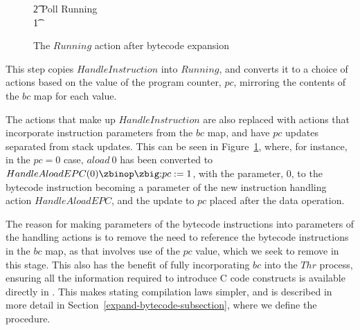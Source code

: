 \begin{figure}[tp]
\begin{circus}
    \t2 \circfi \circseq Poll \circseq Running \\
    \t1 \circfi
  \end{circus}
  \caption{The $Running$ action after bytecode expansion}
  \label{bytecode-expansion-example-figure}
\end{figure}
This step copies $HandleInstruction$ into $Running$, and converts it
to a choice of actions based on the value of the program counter,
$pc$, mirroring the contents of the $bc$ map for each value.

The actions that make up $HandleInstruction$ are also replaced with
actions that incorporate instruction parameters from the $bc$ map, and
have $pc$ updates separated from stack updates.
This can be seen in Figure~\ref{bytecode-expansion-example-figure},
where, for instance, in the $pc = 0$ case, $aload~0$ has been
converted to $HandleAloadEPC(0) \circseq pc := 1$, with the parameter,
$0$, to the bytecode instruction becoming a parameter of the new
instruction handling action $HandleAloadEPC$, and the update to $pc$
placed after the data operation.

The reason for making parameters of the bytecode instructions into
parameters of the handling actions is to remove the need to reference
the bytecode instructions in the $bc$ map, as that involves use of the
$pc$ value, which we seek to remove in this stage.
This also has the benefit of fully incorporating $bc$ into the $Thr$
process, ensuring all the information required to introduce C code
constructs is available directly in \Circus{}.
This makes stating compilation laws simpler, and is described in more
detail in Section~\ref{expand-bytecode-subsection}, where we define
the  procedure.

